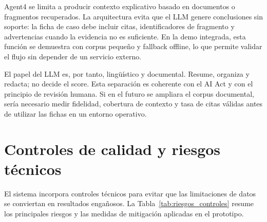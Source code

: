 \documentclass[11pt,a4paper,spanish]{book}
\numberwithin{equation}{chapter}
\numberwithin{figure}{chapter}
\begin{document}
Agent4 se limita a producir contexto explicativo basado en documentos o fragmentos recuperados. La
arquitectura evita que el LLM genere conclusiones sin soporte: la ficha de caso debe incluir citas,
identificadores de fragmento y advertencias cuando la evidencia no es suficiente. En la demo
integrada, esta funci{\'o}n se demuestra con corpus peque{\~n}o y fallback offline, lo que permite
validar el flujo sin depender de un servicio externo.

El papel del LLM es, por tanto, ling{\"u}{\'i}stico y documental. Resume, organiza y redacta; no decide
el score. Esta separaci{\'o}n es coherente con el AI Act y con el principio de revisi{\'o}n humana. Si
en el futuro se ampliara el corpus documental, ser{\'i}a necesario medir fidelidad, cobertura de
contexto y tasa de citas v{\'a}lidas antes de utilizar las fichas en un entorno operativo.

\section{Controles de calidad y riesgos t{\'e}cnicos}
\label{sec:controles_calidad_riesgos}

El sistema incorpora controles t{\'e}cnicos para evitar que las limitaciones de datos se conviertan en
resultados enga{\~n}osos. La Tabla~\ref{tab:riesgos_controles} resume los principales riesgos y las
medidas de mitigaci{\'o}n aplicadas en el prototipo.
\end{document}
